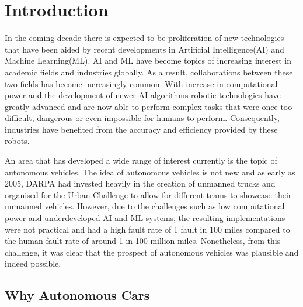 %
%
\let\textcircled=\pgftextcircled
\chapter{Introduction}
\label{chap:intro}

In the coming decade there is expected to be proliferation of new technologies that have been aided by recent developments in Artificial Intelligence(AI) and Machine Learning(ML). AI and ML have become topics of increasing interest in academic fields and industries globally. As a result, collaborations between these two fields has become increasingly common. 
With increase in computational power and the development of newer AI algorithms robotic technologies have greatly advanced and are now able to perform complex tasks that were once too difficult, dangerous or even impossible for humans to perform. Consequently, industries have benefited from the accuracy and efficiency provided by these robots. 

An area that has developed a wide range of interest currently is the topic of autonomous vehicles. The idea of autonomous vehicles is not new and as early as 2005, DARPA had invested heavily in the creation of unmanned trucks and organised for the Urban Challenge to allow for different teams to showcase their unmanned vehicles. However, due to the challenges such as low computational power and underdeveloped AI and ML systems, the resulting implementations were not practical and had a high fault rate of 1 fault in 100 miles compared to the human fault rate of around 1 in 100 million miles. Nonetheless, from this challenge, it was clear that the prospect of autonomous vehicles was plausible and indeed possible. 

\section{Why Autonomous Cars}

